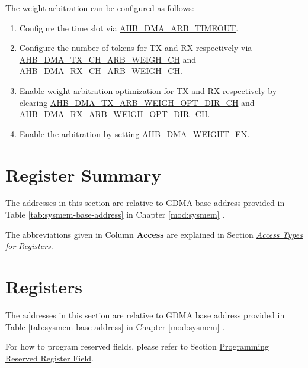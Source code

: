 \documentclass[main\_\_EN.tex]{subfiles}
\begin{document}
The weight arbitration can be configured as follows:
\begin{enumerate}
    \item Configure the time slot via \hyperref[fielddesc:AHBDMAARBTIMEOUT]{AHB\_DMA\_ARB\_TIMEOUT}.
    \item Configure the number of tokens for TX and RX respectively via \hyperref[fielddesc:AHBDMATXCHARBWEIGHCHN]{AHB\_DMA\_TX\_CH\_ARB\_WEIGH\_CH} and \hyperref[fielddesc:AHBDMARXCHARBWEIGHCHN]{AHB\_DMA\_RX\_CH\_ARB\_WEIGH\_CH}.
    \item Enable weight arbitration optimization for TX and RX respectively by clearing \hyperref[fielddesc:AHBDMATXARBWEIGHOPTDIRCHN]{AHB\_DMA\_TX\_ARB\_WEIGH\_OPT\_DIR\_CH} and \hyperref[fielddesc:AHBDMARXARBWEIGHOPTDIRCHN]{AHB\_DMA\_RX\_ARB\_WEIGH\_OPT\_DIR\_CH}.
    \item Enable the arbitration by setting \hyperref[fielddesc:AHBDMAWEIGHTEN]{AHB\_DMA\_WEIGHT\_EN}.
\end{enumerate}





\newpage
\begin{landscape}
\hypertarget{dma-reg-summ}{}
\section{Register Summary}
\label{sec:dma-reg-summ}


The addresses in this section are relative to GDMA base address provided in Table \ref{tab:sysmem-base-address} in Chapter \ref{mod:sysmem} \textit{}.

The abbreviations given in Column \textbf{Access} are explained in Section \hyperref[glossary-access-types]{\textit{Access Types for Registers}}.



\end{landscape}



\newpage
\section{Registers}

The addresses in this section are relative to GDMA base address provided in Table \ref{tab:sysmem-base-address} in Chapter \ref{mod:sysmem} \textit{}.

For how to program reserved fields, please refer to Section \hyperref[programming-reserved-field]{Programming Reserved Register Field}.


\end{document}
